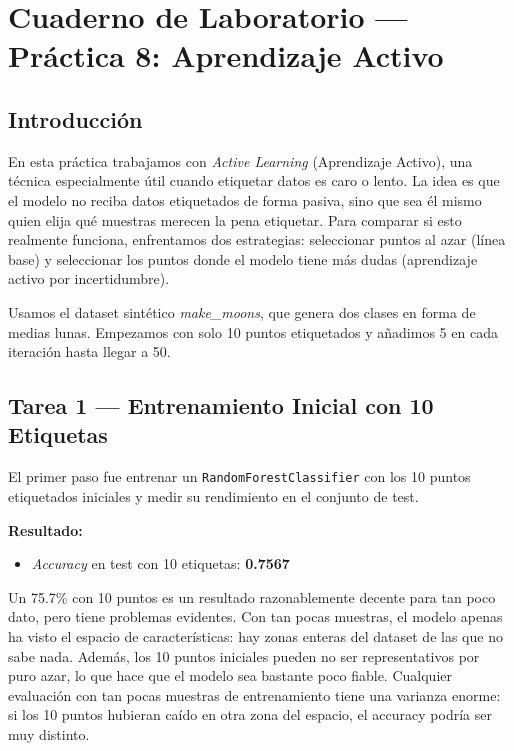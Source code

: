 \documentclass[../../__memoria.tex]{subfiles}
\begin{document}
\standalonecover
\pagestyle{cuerpo}

\graphicspath{{\subfix{../../Imagenes/}}{../../Imagenes/}{\subfix{img/}}{img/}}

\chapter[Práctica 8: Aprendizaje Activo]{Cuaderno de Laboratorio --- Práctica 8: Aprendizaje Activo}

\section*{Introducción}
En esta práctica trabajamos con \textit{Active Learning} (Aprendizaje Activo), una técnica especialmente útil cuando etiquetar datos es caro o lento. La idea es que el modelo no reciba datos etiquetados de forma pasiva, sino que sea él mismo quien elija qué muestras merecen la pena etiquetar. Para comparar si esto realmente funciona, enfrentamos dos estrategias: seleccionar puntos al azar (línea base) y seleccionar los puntos donde el modelo tiene más dudas (aprendizaje activo por incertidumbre).

Usamos el dataset sintético \textit{make\_moons}, que genera dos clases en forma de medias lunas. Empezamos con solo 10 puntos etiquetados y añadimos 5 en cada iteración hasta llegar a 50.

\section[Tarea 1: Entrenamiento Inicial]{Tarea 1 --- Entrenamiento Inicial con 10 Etiquetas}

El primer paso fue entrenar un \texttt{RandomForestClassifier} con los 10 puntos etiquetados iniciales y medir su rendimiento en el conjunto de test.

\textbf{Resultado:}
\begin{itemize}
    \item \textit{Accuracy} en test con 10 etiquetas: \textbf{0.7567}
\end{itemize}

Un 75.7\% con 10 puntos es un resultado razonablemente decente para tan poco dato, pero tiene problemas evidentes. Con tan pocas muestras, el modelo apenas ha visto el espacio de características: hay zonas enteras del dataset de las que no sabe nada. Además, los 10 puntos iniciales pueden no ser representativos por puro azar, lo que hace que el modelo sea bastante poco fiable. Cualquier evaluación con tan pocas muestras de entrenamiento tiene una varianza enorme: si los 10 puntos hubieran caído en otra zona del espacio, el accuracy podría ser muy distinto.
\end{document}
